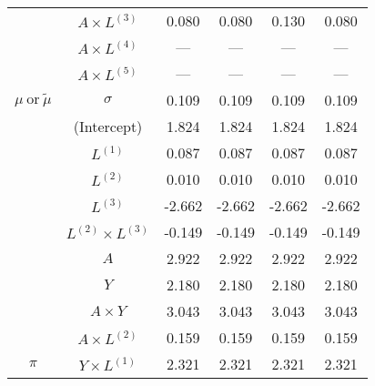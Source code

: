 \begin{sidewaystable}
\begin{minipage}[t]{0.5\textwidth}
\begin{tabular}[t]{>{}ccccc>{}c}
\cmidrule{2-6}
 & $A \times L^{(3)}$ & 0.080 & 0.080 & 0.130 & 0.080\\
\cmidrule{2-6}
 & $A \times L^{(4)}$ & --- & --- & --- & ---\\
\cmidrule{2-6}
 & $A \times L^{(5)}$ & --- & --- & --- & ---\\
\cmidrule{2-6}
\multirow{-15}{*}{\centering\arraybackslash $\mu~\text{or}~\tilde\mu$} & $\sigma$ & 0.109 & 0.109 & 0.109 & 0.109\\
\cmidrule{1-6}
 & (Intercept) & 1.824 & 1.824 & 1.824 & 1.824\\
\cmidrule{2-6}
 & $L^{(1)}$ & 0.087 & 0.087 & 0.087 & 0.087\\
\cmidrule{2-6}
 & $L^{(2)}$ & 0.010 & 0.010 & 0.010 & 0.010\\
\cmidrule{2-6}
 & $L^{(3)}$ & -2.662 & -2.662 & -2.662 & -2.662\\
\cmidrule{2-6}
 & $L^{(2)} \times L^{(3)}$ & -0.149 & -0.149 & -0.149 & -0.149\\
\cmidrule{2-6}
 & $A$ & 2.922 & 2.922 & 2.922 & 2.922\\
\cmidrule{2-6}
 & $Y$ & 2.180 & 2.180 & 2.180 & 2.180\\
\cmidrule{2-6}
 & $A\times Y$ & 3.043 & 3.043 & 3.043 & 3.043\\
\cmidrule{2-6}
 & $A \times L^{(2)}$ & 0.159 & 0.159 & 0.159 & 0.159\\
\cmidrule{2-6}
\multirow{-10}{*}{\centering\arraybackslash $\pi$} & $Y \times L^{(1)}$ & 2.321 & 2.321 & 2.321 & 2.321\\
\hline
\end{tabular}
\end{minipage}
\begin{minipage}[t]{0.5\textwidth}


\end{minipage}
\end{sidewaystable}
